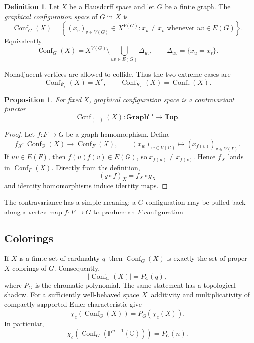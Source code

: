 \documentclass[11pt]{amsart}
\theoremstyle{plain}
\newtheorem{proposition}[theorem]{Proposition}
\theoremstyle{definition}
\newtheorem{definition}[theorem]{Definition}
\theoremstyle{remark}
\newcommand{\C}{\mathbb{C}}
\newcommand{\PP}{\mathbb{P}}
\newcommand{\Conf}{\operatorname{Conf}}
\newcommand{\Graphs}{\mathbf{Graph}}
\begin{document}
\begin{definition}
Let $X$ be a Hausdorff space and let $G$ be a finite graph.  The \emph{graphical
configuration space} of $G$ in $X$ is
\[
  \Conf_G(X)
  =\left\{(x_v)_{v\in V(G)}\in X^{V(G)}:
    x_u\neq x_v\text{ whenever }uv\in E(G)\right\}.
\]
Equivalently,
\[
  \Conf_G(X)
  =X^{V(G)}\setminus\bigcup_{uv\in E(G)}\Delta_{uv},
  \qquad
  \Delta_{uv}=\{x_u=x_v\}.
\]
\end{definition}

Nonadjacent vertices are allowed to collide.  Thus the two extreme cases are
\[
  \Conf_{\overline K_r}(X)=X^r,
  \qquad
  \Conf_{K_r}(X)=\Conf_r(X).
\]

\begin{proposition}\label{prop:conf-functor}
For fixed $X$, graphical configuration space is a contravariant functor
\[
  \Conf_{(-)}(X):\Graphs^{\mathrm{op}}\longrightarrow \mathbf{Top}.
\]
\end{proposition}

\begin{proof}
Let $f:F\to G$ be a graph homomorphism.  Define
\[
  f_X:\Conf_G(X)\longrightarrow\Conf_F(X),
  \qquad
  (x_w)_{w\in V(G)}\longmapsto (x_{f(v)})_{v\in V(F)}.
\]
If $uv\in E(F)$, then $f(u)f(v)\in E(G)$, so
$x_{f(u)}\neq x_{f(v)}$.  Hence $f_X$ lands in $\Conf_F(X)$.  Directly from
the definition,
\[
  (g\circ f)_X=f_X\circ g_X
\]
and identity homomorphisms induce identity maps.
\end{proof}

The contravariance has a simple meaning: a $G$-configuration may be pulled
back along a vertex map $f:F\to G$ to produce an $F$-configuration.

\subsection{Colorings}

If $X$ is a finite set of cardinality $q$, then $\Conf_G(X)$ is exactly the set
of proper $X$-colorings of $G$.  Consequently,
\[
  |\Conf_G(X)|=P_G(q),
\]
where $P_G$ is the chromatic polynomial.  The same statement has a topological
shadow.  For a sufficiently well-behaved space $X$, additivity and
multiplicativity of compactly supported Euler characteristic give
\begin{equation}\label{eq:euler-chromatic}
  \chi_c(\Conf_G(X))=P_G(\chi_c(X)).
\end{equation}
In particular,
\[
  \chi_c\!\left(\Conf_G(\PP^{n-1}(\C))\right)=P_G(n).
\]
\end{document}
